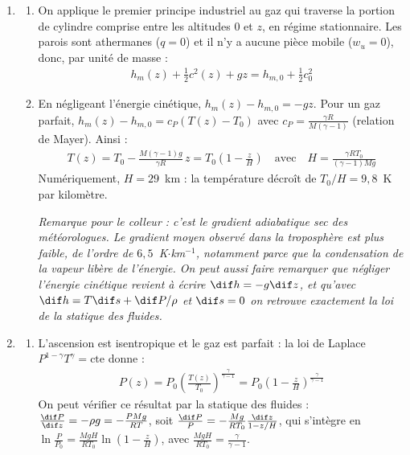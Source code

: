 \newpage

\begin{correction}

\begin{enumerate}

\item

\begin{enumerate}

	\item On applique le premier principe industriel au gaz qui traverse la portion de cylindre comprise entre les altitudes $0$ et $z$, en régime stationnaire. Les parois sont athermanes ($q=0$) et il n'y a aucune pièce mobile ($w_u=0$), donc, par unité de masse :
	\begin{align*}
		\boxed{h_m(z)+\frac{1}{2}c^2(z)+gz=h_{m,0}+\frac{1}{2}c_0^2}
	\end{align*}

	\item En négligeant l'énergie cinétique, $h_m(z)-h_{m,0}=-gz$. Pour un gaz parfait, $h_m(z)-h_{m,0}=c_P\left(T(z)-T_0\right)$ avec $c_P=\frac{\gamma R}{M(\gamma-1)}$ (relation de Mayer). Ainsi :
	\begin{align*}
		T(z)=T_0-\frac{M(\gamma-1)g}{\gamma R}\,z=T_0\left(1-\frac{z}{H}\right) \quad\text{avec}\quad \boxed{H=\frac{\gamma RT_0}{(\gamma-1)Mg}}
	\end{align*}
	Numériquement, $H=29$~km : la température décroît de $T_0/H=9{,}8$~K par kilomètre.

	\textit{Remarque pour le colleur : c'est le gradient adiabatique sec des météorologues. Le gradient moyen observé dans la troposphère est plus faible, de l'ordre de $6{,}5$~K$\cdot$km$^{-1}$, notamment parce que la condensation de la vapeur libère de l'énergie. On peut aussi faire remarquer que négliger l'énergie cinétique revient à écrire $\dif h=-g\dif z$, et qu'avec $\dif h=T\dif s+\dif P/\rho$ et $\dif s=0$ on retrouve exactement la loi de la statique des fluides.}

\end{enumerate}

\item

\begin{enumerate}

	\item L'ascension est isentropique et le gaz est parfait : la loi de Laplace $P^{1-\gamma}T^{\gamma}=\text{cte}$ donne :
	\begin{align*}
		P(z)=P_0\left(\frac{T(z)}{T_0}\right)^{\frac{\gamma}{\gamma-1}}=P_0\left(1-\frac{z}{H}\right)^{\frac{\gamma}{\gamma-1}}
	\end{align*}
	On peut vérifier ce résultat par la statique des fluides : $\frac{\dif P}{\dif z}=-\rho g=-\frac{PMg}{RT}$, soit $\frac{\dif P}{P}=-\frac{Mg}{RT_0}\frac{\dif z}{1-z/H}$, qui s'intègre en $\ln\frac{P}{P_0}=\frac{MgH}{RT_0}\ln\left(1-\frac{z}{H}\right)$, avec $\frac{MgH}{RT_0}=\frac{\gamma}{\gamma-1}$.


\end{enumerate}
\end{enumerate}
\end{correction}
